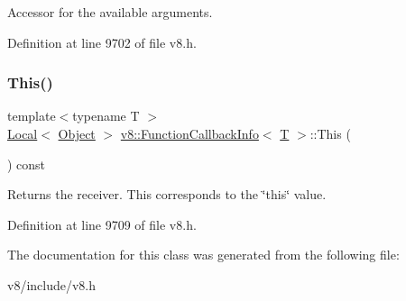 Accessor for the available arguments. 

Definition at line 9702 of file v8.\+h.

\mbox{\label{classv8_1_1FunctionCallbackInfo_a4ddfd6d21732dff1c4c55d5441a8a5ca}} 
\subsubsection{\texorpdfstring{This()}{This()}}
{\footnotesize\ttfamily template$<$typename T $>$ \\
\mbox{\hyperlink{classv8_1_1Local}{Local}}$<$ \mbox{\hyperlink{classv8_1_1Object}{Object}} $>$ \mbox{\hyperlink{classv8_1_1FunctionCallbackInfo}{v8\+::\+Function\+Callback\+Info}}$<$ \mbox{\hyperlink{classv8_1_1internal_1_1torque_1_1T}{T}} $>$\+::This (\begin{DoxyParamCaption}{ }\end{DoxyParamCaption}) const}

Returns the receiver. This corresponds to the \char`\"{}this\char`\"{} value. 

Definition at line 9709 of file v8.\+h.



The documentation for this class was generated from the following file\+:\begin{DoxyCompactItemize}
\item 
v8/include/v8.\+h\end{DoxyCompactItemize}
